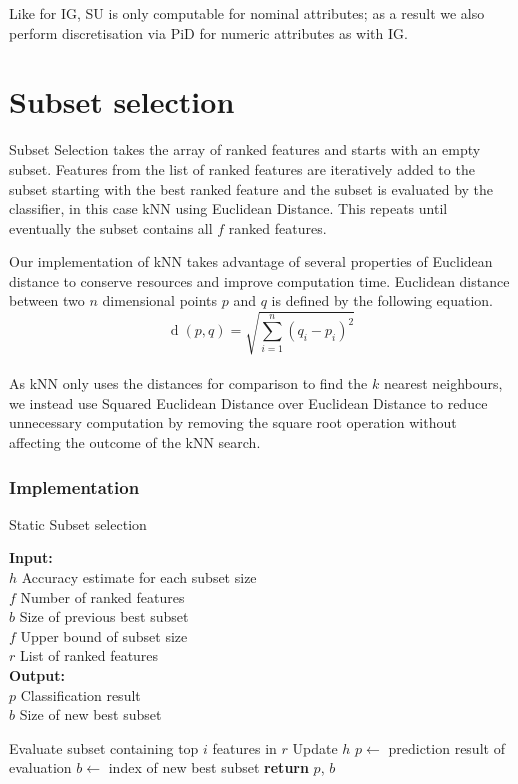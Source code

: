 Like for IG, SU is only computable for nominal attributes; as a result we also perform discretisation via PiD for numeric attributes as with IG.

\section{Subset selection}
Subset Selection takes the array of ranked features and starts with an empty subset. Features from the list of ranked features are iteratively added to the subset starting with the best ranked feature and the subset is evaluated by the classifier, in this case kNN using Euclidean Distance. This repeats until eventually the subset contains all $f$ ranked features.

Our implementation of kNN takes advantage of several properties of Euclidean distance to conserve resources and improve computation time. Euclidean distance between two $n$ dimensional points $p$ and $q$ is defined by the following equation.
\begin{equation}
\operatorname{d}(p,q) = 
\sqrt{
	\sum_{i=1}^n
		\left(
			q_i - p_i
		\right)^2
}
\end{equation}\\

As kNN only uses the distances for comparison to find the $k$ nearest neighbours, we instead use Squared Euclidean Distance over Euclidean Distance to reduce unnecessary computation by removing the square root operation without affecting the outcome of the kNN search.

\subsubsection{Implementation}

\begin{algorithm}[h]
    \caption{Static Subset selection}
    \label{staticSubset}
    \textbf{Input:} \\ 
    $h$ Accuracy estimate for each subset size \\ 
    $f$ Number of ranked features \\ 
    $b$ Size of previous best subset \\ 
    $f$ Upper bound of subset size \\ 
    $r$ List of ranked features \\
	\textbf{Output:} \\
	$p$ Classification result \\
	$b$ Size of new best subset
    \begin{algorithmic}[1] %
            	\State Evaluate subset containing top $i$ features in $r$
            	\State Update $h$
          	  		\State $p\gets$ prediction result of evaluation
            	\EndIf
            \EndFor
            \State $b\gets$ index of new best subset
            \State \textbf{return} $p$, $b$
        \EndProcedure
    \end{algorithmic}
\end{algorithm}

